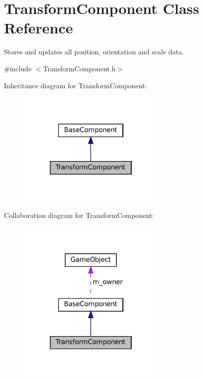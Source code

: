 \hypertarget{classTransformComponent}{}\section{Transform\+Component Class Reference}
\label{classTransformComponent}


Stores and updates all position, orientation and scale data.  




{\ttfamily \#include $<$Transform\+Component.\+h$>$}



Inheritance diagram for Transform\+Component\+:
\nopagebreak
\begin{figure}[H]
\begin{center}
\leavevmode
\includegraphics[width=202pt]{classTransformComponent__inherit__graph}
\end{center}
\end{figure}


Collaboration diagram for Transform\+Component\+:
\nopagebreak
\begin{figure}[H]
\begin{center}
\leavevmode
\includegraphics[width=202pt]{classTransformComponent__coll__graph}
\end{center}
\end{figure}
